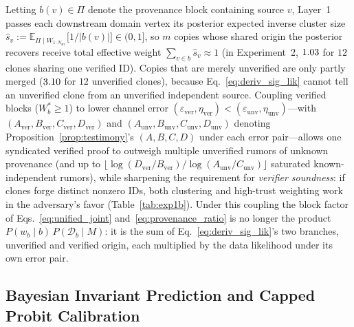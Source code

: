 \documentclass[11pt,a4paper]{article}
\theoremstyle{definition}
\theoremstyle{remark}
\newcommand{\E}{\mathbb{E}}
\begin{document}
Letting $b(v) \in \Pi$ denote the provenance block containing source $v$, Layer~1 passes each downstream domain vertex its posterior expected inverse cluster size $\hat{s}_v := \E_{\Pi \mid W_{1:N_{\mathrm{src}}}}\bigl[1 / |b(v)|\bigr] \in (0, 1]$, so $m$ copies whose shared origin the posterior recovers receive total effective weight $\sum_{v \in b} \hat{s}_v \approx 1$ (in Experiment~2, $1.03$ for $12$ clones sharing one verified ID). Copies that are merely unverified are only partly merged ($3.10$ for $12$ unverified clones), because Eq.~\eqref{eq:deriv_sig_lik} cannot tell an unverified clone from an unverified independent source. Coupling verified blocks ($W_b^* \ge 1$) to lower channel error $(\varepsilon_{\mathrm{ver}}, \eta_{\mathrm{ver}}) < (\varepsilon_{\mathrm{unv}}, \eta_{\mathrm{unv}})$---with $(A_{\mathrm{ver}}, B_{\mathrm{ver}}, C_{\mathrm{ver}}, D_{\mathrm{ver}})$ and $(A_{\mathrm{unv}}, B_{\mathrm{unv}}, C_{\mathrm{unv}}, D_{\mathrm{unv}})$ denoting Proposition~\ref{prop:testimony}'s $(A, B, C, D)$ under each error pair---allows one syndicated verified proof to outweigh multiple unverified rumors of unknown provenance (and up to $\lfloor \log(D_{\mathrm{ver}}/B_{\mathrm{ver}}) / \log(A_{\mathrm{unv}}/C_{\mathrm{unv}}) \rfloor$ saturated known-independent rumors), while sharpening the requirement for \emph{verifier soundness}: if clones forge distinct nonzero IDs, both clustering and high-trust weighting work in the adversary's favor (Table~\ref{tab:exp1b}). Under this coupling the block factor of Eqs.~\eqref{eq:unified_joint} and~\eqref{eq:provenance_ratio} is no longer the product $P(w_b \mid b)\,P(\mathcal{D}_b \mid M)$: it is the sum of Eq.~\eqref{eq:deriv_sig_lik}'s two branches, unverified and verified origin, each multiplied by the data likelihood under its own error pair.

\subsection{Bayesian Invariant Prediction and Capped Probit Calibration}
\end{document}
